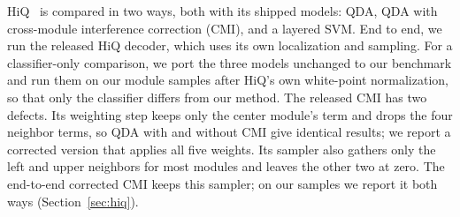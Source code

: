 HiQ~\cite{yang2018hiq} is compared in two ways, both with its shipped models: QDA, QDA
with cross-module interference correction (CMI), and a layered SVM. End to end, we run the
released HiQ decoder, which uses its own localization and sampling. For a classifier-only
comparison, we port the three models unchanged to our benchmark and run them on our module
samples after HiQ's own white-point normalization, so that only the classifier differs from
our method. The released CMI has two defects. Its weighting step keeps only the center
module's term and drops the four neighbor terms, so QDA with and without CMI give identical
results; we report a corrected version that applies all five weights. Its sampler also
gathers only the left and upper neighbors for most modules and leaves the other two at zero.
The end-to-end corrected CMI keeps this sampler; on our samples we report it both ways
(Section~\ref{sec:hiq}).
